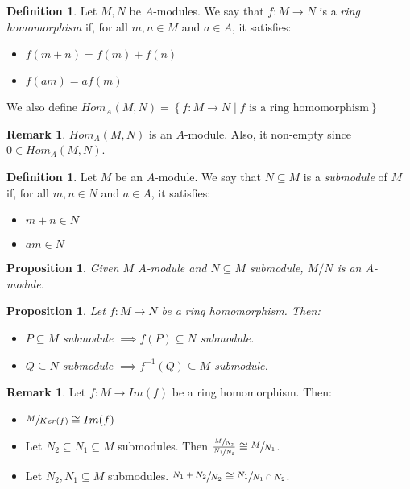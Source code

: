 \documentclass[11pt]{article}
\newtheorem{prop}[theorem]{Proposition}
\theoremstyle{definition}
\newtheorem{defn}[theorem]{Definition}
\newtheorem{rk}[theorem]{Remark}
\begin{document}
        \begin{defn}
            Let $M, N$ be $A$-modules.
            We say that $f: M \longrightarrow N$ is a \emph{ring homomorphism} if, for all $m,n \in M$ and $a \in A$, it satisfies:
            \begin{itemize}
                \item $f(m + n) = f(m) + f(n)$
                \item $f(am) = a f(m)$
            \end{itemize}
            We also define $Hom_A(M,N) = \left\{ f: M \longrightarrow N \mid f \text{ is a ring homomorphism}\right\}$
        \end{defn}

        \begin{rk}
            $Hom_A(M,N)$ is an $A$-module.
            Also, it non-empty since $0 \in Hom_A(M,N)$.
        \end{rk}

        \begin{defn}
            Let $M$ be an $A$-module.
            We say that $N \subseteq M$ is a \emph{submodule} of $M$ if, for all $m, n \in N$ and $a \in A$, it satisfies:
            \begin{itemize}
                \item $m + n \in N$
                \item $am \in N$
            \end{itemize}
        \end{defn}

        \begin{prop}
            Given $M$ $A$-module and $N \subseteq M$ submodule, $M/N$ is an $A$-module.
        \end{prop}

        \begin{prop}
            Let $f: M \longrightarrow N$ be a ring homomorphism.
            Then:
            \begin{itemize}
                \item $P \subseteq M$ submodule $\implies f(P) \subseteq N$ submodule.
                \item $Q \subseteq N$ submodule $\implies f^{-1}(Q) \subseteq M$ submodule.
            \end{itemize}
        \end{prop}

        \begin{rk}
            Let $f: M \longrightarrow Im(f)$ be a ring homomorphism.
            Then:
            \begin{itemize}
                \item $\sfrac{M}{Ker(f)} \cong Im(f)$
                \item Let $N_2 \subseteq N_1 \subseteq M$ submodules.
                Then $\frac{\sfrac{M}{N_2}}{\sfrac{N_1}{N_2}} \cong \sfrac{M}{N_1}$.
                \item Let $N_2, N_1 \subseteq M$ submodules.
                $\sfrac{N_1 + N_2}{N_2} \cong \sfrac{N_1}{N_1 \cap N_2}$.
            \end{itemize}
        \end{rk}
\end{document}
